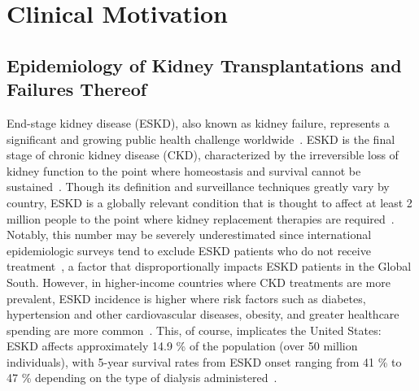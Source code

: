 
\section{Clinical Motivation}

\subsection{Epidemiology of Kidney Transplantations and Failures Thereof}


End-stage kidney disease (ESKD), also known as kidney failure, represents a significant and growing public health challenge worldwide~\cite{bikbov_Global_2020}. ESKD is the final stage of chronic kidney disease (CKD), characterized by the irreversible loss of kidney function to the point where homeostasis and survival cannot be sustained~\cite{shringi_EndStage_2026}. Though its definition and surveillance techniques greatly vary by country, ESKD is a globally relevant condition that is thought to affect at least 2 million people to the point where kidney replacement therapies are required~\cite{trillini_Epidemiology_2017,gupta_Epidemiology_2021}. Notably, this number may be severely underestimated since international epidemiologic surveys tend to exclude ESKD patients who do not receive treatment~\cite{thurlow_Global_2021}, a factor that disproportionally impacts ESKD patients in the Global South. However, in higher-income countries where CKD treatments are more prevalent, ESKD incidence is higher where risk factors such as diabetes, hypertension and other cardiovascular diseases, obesity, and greater healthcare spending are more common~\cite{thurlow_Global_2021}. This, of course, implicates the United States: ESKD affects approximately 14.9 \% of the population (over 50 million individuals), with 5-year survival rates from ESKD onset ranging from 41 \% to 47 \% depending on the type of dialysis administered~\cite{gupta_Epidemiology_2021}.

